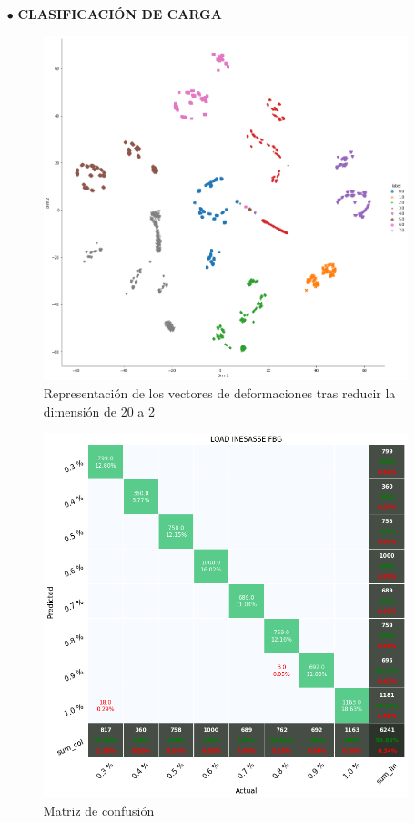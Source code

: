 \begin{itemize}
    \item[$\bullet$] \textbf{CLASIFICACIÓN DE CARGA}
    
    \begin{figure}[h!]
        \centering
        \includegraphics[width=150mm]{3/Fotos/Load_INESASSE_t-sne.png}
        \captionsetup{justification=centering,margin=1.25cm}
        \caption{Representación de los vectores de deformaciones tras reducir la dimensión de 20 a 2}
        \label{def_h}
    \end{figure}  
    
    \begin{figure}[h!]
        \centering
        \includegraphics[width=150mm]{3/Fotos/Load_INESASSE_confusion.png}
        \captionsetup{justification=centering,margin=1.25cm}
        \caption{Matriz de confusión}
        \label{def_h}
    \end{figure}  
    

\end{itemize}
